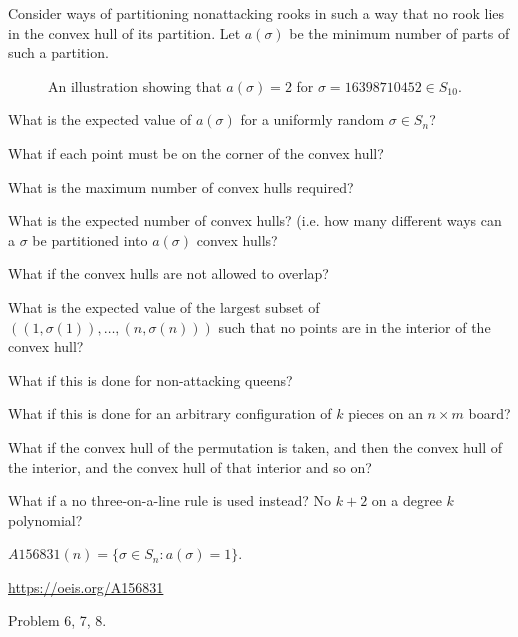 \documentclass{article}
\begin{document}
Consider ways of partitioning nonattacking rooks in such a way that no rook lies
in the convex hull of its partition. Let $a(\sigma)$ be the minimum number of parts
of such a partition.
\begin{figure}[ht!]
  \centering
  \caption{
    An illustration showing that $a(\sigma) = 2$ for $\sigma = 16398710452 \in S_{10}$.
  }
\end{figure}

\begin{question}
  What is the expected value of $a(\sigma)$ for a uniformly random $\sigma \in S_n$?
\end{question}

\begin{related}
  \item What if each point must be on the corner of the convex hull?
  \item What is the maximum number of convex hulls required?
  \item What is the expected number of convex hulls?
  (i.e. how many different ways can a $\sigma$ be partitioned into
  $a(\sigma)$ convex hulls?
  \item What if the convex hulls are not allowed to overlap?
  \item What is the expected value of the largest subset of
    $((1, \sigma(1)), \hdots, (n, \sigma(n)))$ such that no points are in the
    interior of the convex hull?
  \item What if this is done for non-attacking queens?
  \item What if this is done for an arbitrary configuration of $k$ pieces on an
    $n \times m$ board?
  \item What if the convex hull of the permutation is taken, and then the convex
  hull of the interior, and the convex hull of that interior and so on?
  \item What if a no three-on-a-line rule is used instead?
  No $k+2$ on a degree $k$ polynomial?
\end{related}

\begin{note}
  \item $A156831(n) = \{ \sigma \in S_n : a(\sigma) = 1 \}$.
\end{note}

\begin{references}
  \item \url{https://oeis.org/A156831}
  \item Problem 6, 7, 8.
\end{references}
\end{document}
